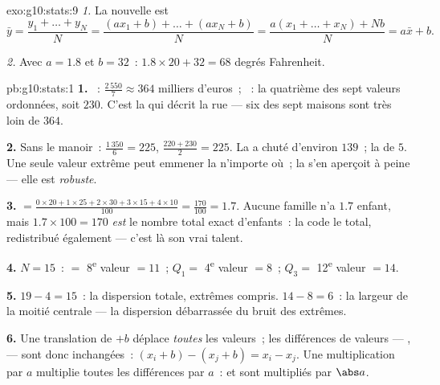 \begin{solution}{exo:g10:stats:9}
\emph{1.} La nouvelle  est
\[
\bar y = \frac{y_1 + \dots + y_N}{N}
= \frac{(a x_1 + b) + \dots + (a x_N + b)}{N}
= \frac{a(x_1 + \dots + x_N) + Nb}{N}
= a \bar x + b .
\]

\emph{2.} Avec $a = 1.8$ et $b = 32$~: 
$1.8 \times 20 + 32 = 68$ degrés Fahrenheit.
\end{solution}

\begin{solution}{pb:g10:stats:1}
\textbf{1.} ~: $\frac{2\,550}{7} \approx 364$ milliers
d'euros~; ~: la quatrième des sept valeurs ordonnées, soit
$230$. C'est la  qui décrit la rue --- six des sept maisons
sont très loin de $364$.

\textbf{2.} Sans le manoir~:  $\frac{1\,350}{6} = 225$,
 $\frac{220 + 230}{2} = 225$. La  a chuté d'environ
$139$~; la  de $5$. Une seule valeur extrême peut emmener la
 n'importe où~; la  s'en aperçoit à peine --- elle est
\emph{robuste}.

\textbf{3.}  $= \frac{0 \times 20 + 1 \times 25 + 2 \times
30 + 3 \times 15 + 4 \times 10}{100} = \frac{170}{100} = 1.7$.
Aucune famille n'a $1.7$ enfant, mais $1.7 \times 100 = 170$
\emph{est} le nombre total exact d'enfants~: la  code le
total, redistribué également --- c'est là son vrai talent.

\textbf{4.} $N = 15$~:  $=$ 8\textsuperscript{e} valeur
$= 11$~; $Q_1 =$ 4\textsuperscript{e} valeur $= 8$~;
$Q_3 =$ 12\textsuperscript{e} valeur $= 14$.

\textbf{5.}  $19 - 4 = 15$~: la dispersion totale, extrêmes
compris.  $14 - 8 = 6$~: la largeur de la moitié
centrale --- la dispersion débarrassée du bruit des extrêmes.

\textbf{6.} Une translation de $+b$ déplace \emph{toutes} les
valeurs~; les différences de valeurs --- ,  --- sont donc inchangées~:
$(x_i + b) - (x_j + b) = x_i - x_j$. Une multiplication par $a$
multiplie toutes les différences par $a$~:  et  sont multipliés par $\abs a$.


\end{solution}
